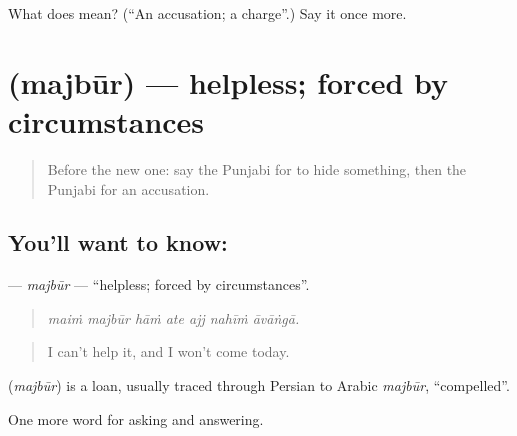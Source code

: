 \begin{tcolorbox}[breakable,colback=teal!4,colframe=teal!35!black,title={Before you move on}]
What does  mean? (\textquotedblleft{}An accusation; a charge\textquotedblright{}.) Say it once more.
\end{tcolorbox}
\section[\texorpdfstring{\pa{ਮਜਬੂਰ} (majbūr)}{ਮਜਬੂਰ (majbūr)}]{ (majbūr) — helpless; forced by circumstances}

\label{lesson:PA-C346-majbur}



\begin{quote}
Before the new one: say the Punjabi for to hide something, then the Punjabi for an accusation.
\end{quote}

\subsection*{You'll want to know: }
\textbf{} — \emph{majbūr} — \textquotedblleft{}helpless; forced by circumstances\textquotedblright{}.

\begin{quote}
      
\end{quote}

\begin{quote}
\emph{maiṁ majbūr hāṁ ate ajj nahīṁ āvāṅgā.}
\end{quote}

\begin{quote}
I can't help it, and I won't come today.
\end{quote}

\begin{cousinweb}
\textbf{} (\emph{majbūr}) is a loan, usually traced through Persian to Arabic \emph{majbūr}, \textquotedblleft{}compelled\textquotedblright{}.
\end{cousinweb}

\begin{grammarlens}[title={What you've built}]
One more word for asking and answering.
\end{grammarlens}

